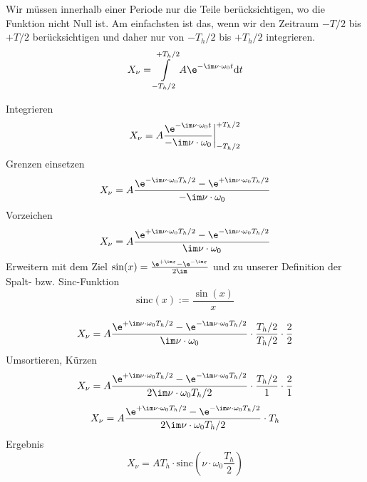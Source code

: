 \begin{Ansatz}
%
Wir müssen innerhalb einer Periode nur die Teile berücksichtigen, wo
die Funktion nicht Null ist. Am einfachsten ist das, wenn wir den
Zeitraum $-T/2$ bis $+T/2$ berücksichtigen und daher nur von $-T_h/2$ bis $+T_h/2$
integrieren.
\begin{equation}
X_\nu =  \int\limits_{-T_h/2}^{+T_h/2} A \e^{-\im \nu \cdot \omega_0 t} \mathrm{d}t
\end{equation}
%
\end{Ansatz}
%
\begin{ExCalc}
Integrieren
\begin{equation}
X_\nu = A \frac{\e^{-\im \nu \cdot \omega_0 t}}{-\im \nu \cdot \omega_0 }\bigg|_{-T_h/2}^{+T_h/2}
\end{equation}
Grenzen einsetzen
\begin{equation}
X_\nu = A \frac{\e^{-\im \nu \cdot \omega_0 T_h/2} - \e^{+\im \nu \cdot \omega_0 T_h/2}}{-\im \nu \cdot \omega_0 }
\end{equation}
Vorzeichen
\begin{equation}
X_\nu = A \frac{\e^{+\im \nu \cdot \omega_0 T_h/2}-\e^{-\im \nu \cdot \omega_0 T_h/2}}{\im \nu \cdot \omega_0 }
\end{equation}
Erweitern mit dem Ziel $\sin(x) = \frac{\e^{+\im x}-\e^{-\im x}}{2\im}$ und zu unserer Definition der Spalt- bzw. Sinc-Funktion
$$\mathrm{sinc}(x):=\frac{\sin(x)}{x}$$

\begin{equation}
X_\nu = A \frac{\e^{+\im \nu \cdot \omega_0 T_h/2}-\e^{-\im \nu \cdot \omega_0 T_h/2}}{\im \nu \cdot \omega_0 } \cdot \frac{T_h/2}{T_h/2} \cdot \frac{2}{2}
\end{equation}
Umsortieren, Kürzen
\begin{equation}
X_\nu = A \frac{\e^{+\im \nu \cdot \omega_0 T_h/2}-\e^{-\im \nu \cdot \omega_0 T_h/2}}{2\im \nu \cdot \omega_0 T_h/2} \cdot \frac{T_h/2}{1} \cdot \frac{2}{1}
\end{equation}
%
\begin{equation}
X_\nu = A \frac{\e^{+\im \nu \cdot \omega_0 T_h/2}-\e^{-\im \nu \cdot \omega_0 T_h/2}}{2\im \nu \cdot \omega_0 T_h/2} \cdot T_h
\end{equation}
%
Ergebnis
\begin{equation}
X_\nu = A T_h \cdot \mathrm{sinc}(\nu \cdot \omega_0 \frac{T_h}{2})
\end{equation}
\end{ExCalc}

